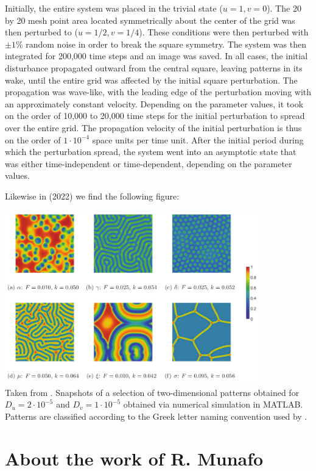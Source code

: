 Initially, the entire system was placed in the trivial state ($u=1,v=0$). The 20 by
20 mesh point area located symmetrically about the center of the grid was then
perturbed to ($u=1/2,v=1/4$). These conditions were then perturbed with $\pm 1\%$
random noise in order to break the square symmetry. The system was then integrated
for 200,000 time steps and an image was saved. In all cases, the initial disturbance
propagated outward from the central square, leaving patterns in its wake, until
the entire grid was affected by the initial square perturbation. The propagation was
wave-like, with the leading edge of the perturbation moving with an approximately
constant velocity. Depending on the parameter values, it took on the order of 10,000 to
20,000 time steps for the initial perturbation to spread over the entire grid. The 
propagation velocity of the initial perturbation is thus on the order of $1\cdot 10^{-4}$ 
space units per time unit. After the initial period during which the perturbation spread, 
the system went into an asymptotic state that was either
time-independent or time-dependent, depending on the parameter values.

Likewise in \textcite{gane22} (2022) we find the following figure:
\begin{center}
\includegraphics[height=7.5cm]{python_codes/fieldstone_171/images/gane22}\\
{\captionfont Taken from \cite{gane22}. 
Snapshots of a selection of two-dimensional patterns obtained for
$D_u=2\cdot 10^{-5}$ and $D_v=1\cdot 10^{-5}$ obtained via numerical 
simulation in MATLAB. Patterns are classified according to the Greek letter 
naming convention used by \textcite{pear93}.
} 
\end{center}

\section*{About the work of R. Munafo}

